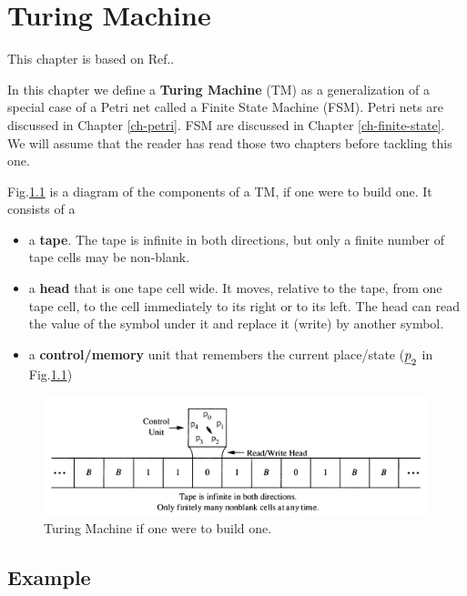 \chapter{Turing Machine}
\label{ch-turing}

\newcommand{\TA}[0]{\Sigma^+}

This chapter is based on Ref.\cite{wiki-turing-machine}.

In this chapter we define a {\bf Turing Machine} (TM) as
 a generalization
of a special case of a Petri net called a Finite
State Machine (FSM).
Petri nets are discussed in Chapter \ref{ch-petri}. FSM are discussed
in Chapter \ref{ch-finite-state}. We will assume
that the reader has read those two chapters before tackling this one.

Fig.\ref{fig-turing-phsical} is
a diagram of the components
of a TM, if one were to build one.
It consists of a 
\begin{itemize}
\item
a {\bf tape}. The tape is infinite in both directions,
but only a finite number of tape cells may be non-blank.
\item
a {\bf head}
that is one tape cell wide. It moves, relative to the tape,  from one tape cell, 
to the cell immediately to its right or to its left.
The head can read the value of the symbol under it and replace
it (write) by another symbol.
\item a {\bf control/memory} unit that remembers 
the current place/state ($\rvp_2$ in Fig.\ref{fig-turing-phsical})
\end{itemize}

\begin{figure}[h!]
\centering
\includegraphics[width=6in]
{turing/turing-physical.jpg}
\caption{Turing Machine if one were to build one.}
\label{fig-turing-phsical}
\end{figure}

\section{Example}

